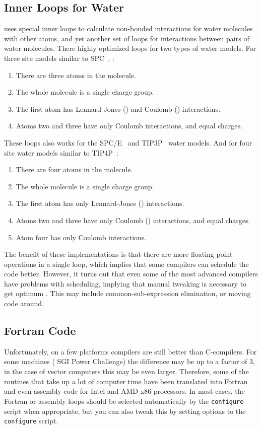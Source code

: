 \subsection{Inner Loops for Water}
\label{sec:waterloops}
{\gromacs} uses special inner loops to calculate non-bonded
interactions for water molecules with other atoms, and yet
another set of loops for interactions between pairs of
water molecules. There highly optimized loops for two types of water models.
For three site models similar to
SPC~\cite{Berendsen81}, {\ie}:
\begin{enumerate}
\item   There are three atoms in the molecule.
\item   The whole molecule is a single charge group.
\item   The first atom has Lennard-Jones () and 
        Coulomb () interactions.
\item   Atoms two and three have only Coulomb interactions, 
        and equal charges.
\end{enumerate}
These loops also works for the SPC/E~\cite{Berendsen87} and 
TIP3P~\cite{Jorgensen83} water models.
And for four site water models similar to TIP4P~\cite{Jorgensen83}:
\begin{enumerate}
\item   There are four atoms in the molecule.
\item   The whole molecule is a single charge group.
\item   The first atom has only Lennard-Jones () interactions.
\item   Atoms two and three have only Coulomb () interactions, 
        and equal charges.
\item   Atom four has only Coulomb interactions.
\end{enumerate}

The benefit of these implementations is that there are more floating-point
operations in a single loop, which implies that some compilers
can schedule the code better. However, it turns out that even
some of the most advanced compilers have problems with scheduling, 
implying that manual tweaking is necessary to get optimum 
.
This may include common-sub-expression elimination, or moving
code around. 

\subsection{Fortran Code}
Unfortunately, on a few platforms  compilers are
still better than C-compilers. For some machines ({\eg} SGI
Power Challenge) the difference may be up to a factor of 3, in the
case of vector computers this may be even larger. Therefore, some of
the routines that take up a lot of computer time have been translated
into Fortran and even assembly code for Intel and AMD x86 processors.
In most cases, the Fortran or assembly loops should be selected 
automatically by the {\tt configure} script when appropriate, but you can
also tweak this by setting options to the {\tt configure} script.

